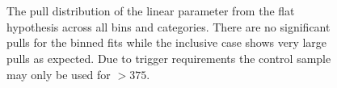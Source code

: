 \begin{figure}[h!]
  \centering
  ~~
  \\
  ~~
  \\
  \caption{\label{fig:frenchFlagPulls} The pull distribution of the linear parameter from the flat hypothesis across all
  \scalht bins and categories. There are no significant pulls for the \scalht binned
  fits while the \scalht inclusive case shows very large pulls as expected. 
  Due to trigger requirements the \gj control sample may only be used for \scalht $> 375$\GeV.}
\end{figure}

